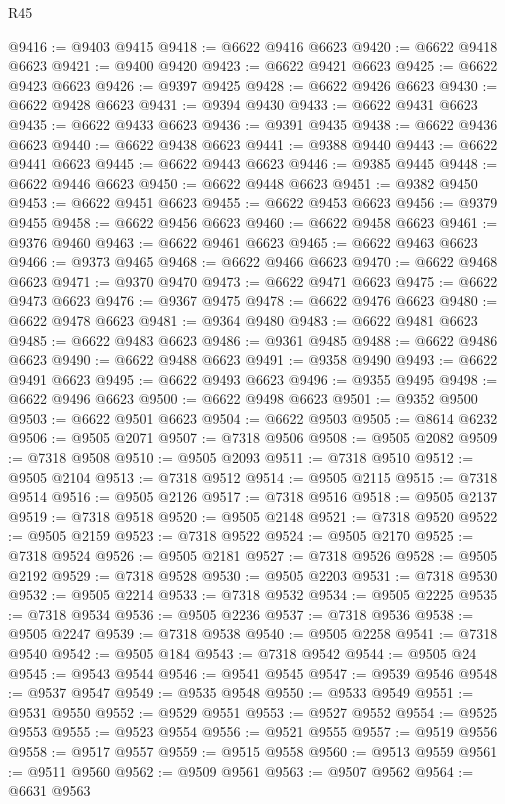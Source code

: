 \begin{lexlean}{R45}
\begin{coremodule}
{@9416 := @9403 @9415
@9418 := @6622 @9416 @6623
@9420 := @6622 @9418 @6623
@9421 := @9400 @9420
@9423 := @6622 @9421 @6623
@9425 := @6622 @9423 @6623
@9426 := @9397 @9425
@9428 := @6622 @9426 @6623
@9430 := @6622 @9428 @6623
@9431 := @9394 @9430
@9433 := @6622 @9431 @6623
@9435 := @6622 @9433 @6623
@9436 := @9391 @9435
@9438 := @6622 @9436 @6623
@9440 := @6622 @9438 @6623
@9441 := @9388 @9440
@9443 := @6622 @9441 @6623
@9445 := @6622 @9443 @6623
@9446 := @9385 @9445
@9448 := @6622 @9446 @6623
@9450 := @6622 @9448 @6623
@9451 := @9382 @9450
@9453 := @6622 @9451 @6623
@9455 := @6622 @9453 @6623
@9456 := @9379 @9455
@9458 := @6622 @9456 @6623
@9460 := @6622 @9458 @6623
@9461 := @9376 @9460
@9463 := @6622 @9461 @6623
@9465 := @6622 @9463 @6623
@9466 := @9373 @9465
@9468 := @6622 @9466 @6623
@9470 := @6622 @9468 @6623
@9471 := @9370 @9470
@9473 := @6622 @9471 @6623
@9475 := @6622 @9473 @6623
@9476 := @9367 @9475
@9478 := @6622 @9476 @6623
@9480 := @6622 @9478 @6623
@9481 := @9364 @9480
@9483 := @6622 @9481 @6623
@9485 := @6622 @9483 @6623
@9486 := @9361 @9485
@9488 := @6622 @9486 @6623
@9490 := @6622 @9488 @6623
@9491 := @9358 @9490
@9493 := @6622 @9491 @6623
@9495 := @6622 @9493 @6623
@9496 := @9355 @9495
@9498 := @6622 @9496 @6623
@9500 := @6622 @9498 @6623
@9501 := @9352 @9500
@9503 := @6622 @9501 @6623
@9504 := @6622 @9503
@9505 := @8614 @6232
@9506 := @9505 @2071
@9507 := @7318 @9506
@9508 := @9505 @2082
@9509 := @7318 @9508
@9510 := @9505 @2093
@9511 := @7318 @9510
@9512 := @9505 @2104
@9513 := @7318 @9512
@9514 := @9505 @2115
@9515 := @7318 @9514
@9516 := @9505 @2126
@9517 := @7318 @9516
@9518 := @9505 @2137
@9519 := @7318 @9518
@9520 := @9505 @2148
@9521 := @7318 @9520
@9522 := @9505 @2159
@9523 := @7318 @9522
@9524 := @9505 @2170
@9525 := @7318 @9524
@9526 := @9505 @2181
@9527 := @7318 @9526
@9528 := @9505 @2192
@9529 := @7318 @9528
@9530 := @9505 @2203
@9531 := @7318 @9530
@9532 := @9505 @2214
@9533 := @7318 @9532
@9534 := @9505 @2225
@9535 := @7318 @9534
@9536 := @9505 @2236
@9537 := @7318 @9536
@9538 := @9505 @2247
@9539 := @7318 @9538
@9540 := @9505 @2258
@9541 := @7318 @9540
@9542 := @9505 @184
@9543 := @7318 @9542
@9544 := @9505 @24
@9545 := @9543 @9544
@9546 := @9541 @9545
@9547 := @9539 @9546
@9548 := @9537 @9547
@9549 := @9535 @9548
@9550 := @9533 @9549
@9551 := @9531 @9550
@9552 := @9529 @9551
@9553 := @9527 @9552
@9554 := @9525 @9553
@9555 := @9523 @9554
@9556 := @9521 @9555
@9557 := @9519 @9556
@9558 := @9517 @9557
@9559 := @9515 @9558
@9560 := @9513 @9559
@9561 := @9511 @9560
@9562 := @9509 @9561
@9563 := @9507 @9562
@9564 := @6631 @9563
}
\end{coremodule}
\end{lexlean}
